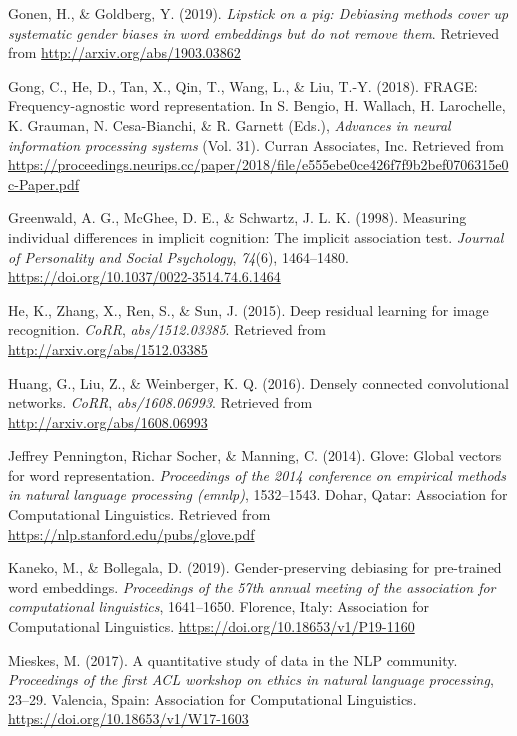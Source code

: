 \documentclass[
  english,
  man,floatsintext]{apa6}
\begin{document}
\leavevmode\hypertarget{ref-gonen_2019}{}%
Gonen, H., \& Goldberg, Y. (2019). \emph{Lipstick on a pig: Debiasing methods cover up systematic gender biases in word embeddings but do not remove them}. Retrieved from \url{http://arxiv.org/abs/1903.03862}

\leavevmode\hypertarget{ref-gong_2018}{}%
Gong, C., He, D., Tan, X., Qin, T., Wang, L., \& Liu, T.-Y. (2018). FRAGE: Frequency-agnostic word representation. In S. Bengio, H. Wallach, H. Larochelle, K. Grauman, N. Cesa-Bianchi, \& R. Garnett (Eds.), \emph{Advances in neural information processing systems} (Vol. 31). Curran Associates, Inc. Retrieved from \url{https://proceedings.neurips.cc/paper/2018/file/e555ebe0ce426f7f9b2bef0706315e0c-Paper.pdf}

\leavevmode\hypertarget{ref-greenwald_1998}{}%
Greenwald, A. G., McGhee, D. E., \& Schwartz, J. L. K. (1998). Measuring individual differences in implicit cognition: The implicit association test. \emph{Journal of Personality and Social Psychology}, \emph{74}(6), 1464--1480. \url{https://doi.org/10.1037/0022-3514.74.6.1464}

\leavevmode\hypertarget{ref-he_2015}{}%
He, K., Zhang, X., Ren, S., \& Sun, J. (2015). Deep residual learning for image recognition. \emph{CoRR}, \emph{abs/1512.03385}. Retrieved from \url{http://arxiv.org/abs/1512.03385}

\leavevmode\hypertarget{ref-huang_2016}{}%
Huang, G., Liu, Z., \& Weinberger, K. Q. (2016). Densely connected convolutional networks. \emph{CoRR}, \emph{abs/1608.06993}. Retrieved from \url{http://arxiv.org/abs/1608.06993}

\leavevmode\hypertarget{ref-pennington_2014}{}%
Jeffrey Pennington, Richar Socher, \& Manning, C. (2014). Glove: Global vectors for word representation. \emph{Proceedings of the 2014 conference on empirical methods in natural language processing (emnlp)}, 1532--1543. Dohar, Qatar: Association for Computational Linguistics. Retrieved from \url{https://nlp.stanford.edu/pubs/glove.pdf}

\leavevmode\hypertarget{ref-kaneko_2019}{}%
Kaneko, M., \& Bollegala, D. (2019). Gender-preserving debiasing for pre-trained word embeddings. \emph{Proceedings of the 57th annual meeting of the association for computational linguistics}, 1641--1650. Florence, Italy: Association for Computational Linguistics. \url{https://doi.org/10.18653/v1/P19-1160}

\leavevmode\hypertarget{ref-mieskes_2017}{}%
Mieskes, M. (2017). A quantitative study of data in the NLP community. \emph{Proceedings of the first ACL workshop on ethics in natural language processing}, 23--29. Valencia, Spain: Association for Computational Linguistics. \url{https://doi.org/10.18653/v1/W17-1603}
\end{document}
